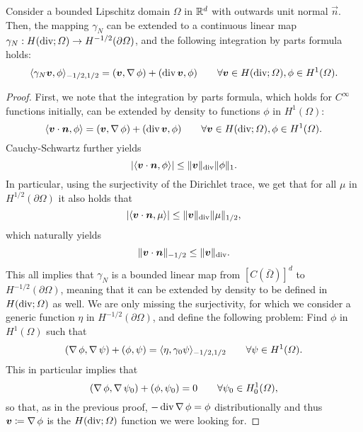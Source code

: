 \begin{theorem}\label{thm:normal-trace}
Consider a bounded Lipschitz domain $\Omega$ in $\mathbb{R}^d$ with outwards unit normal $\vec n$. Then, the mapping $\gamma_N$ can be extended to a continuous linear map $\gamma_N: H(\operatorname{\text{div}}; \Omega) \to H^{-1/2}(\partial\Omega)$, and the following integration by parts formula holds: 
\begin{equation}\label{eq:ibp-normal-trace}
    \langle \gamma_N \vec v, \phi \rangle_{-1/2, 1/2} = (\vec v, \grad \phi) + (\dive \vec v, \phi) \qquad \forall \vec v\in H(\dive;\Omega), \phi \in H^1(\Omega).
\end{equation}
\begin{proof}
First, we note that the integration by parts formula, which holds for $C^\infty$ functions initially, can be extended by density to functions $\phi$ in $H^1(\Omega)$:
\begin{equation*}
    \langle \vec v\cdot \vec n, \phi \rangle = (\vec v, \grad \phi) + (\dive \vec v, \phi) \qquad \forall \vec v\in H(\dive;\Omega), \phi \in H^1(\Omega).
\end{equation*}
Cauchy-Schwartz further yields
\begin{equation*}
    |\langle \vec v\cdot \vec n, \phi\rangle | \leq \| \vec v \|_{\dive} \| \phi \|_1.
\end{equation*}
In particular, using the surjectivity of the Dirichlet trace, we get that for all $\mu$ in $H^{1/2}(\partial\Omega)$ it also holds that
\begin{equation*}
    |\langle \vec v\cdot \vec n, \mu\rangle | \leq \| \vec v \|_{\dive} \| \mu \|_{1/2},
\end{equation*}
which naturally yields
\begin{equation*}
    \| \vec v \cdot \vec n\|_{-1/2} \leq \| \vec v\|_{\dive}.
\end{equation*}
This all implies that $\gamma_N$ is a bounded linear map from $[C(\bar\Omega)]^d$ to $H^{-1/2}(\partial\Omega)$, meaning that it can be extended by density to be defined in $H(\operatorname{\text{div}};\Omega)$ as well. We are only missing the surjectivity, for which we consider a generic function $\eta$ in $H^{-1/2}(\partial\Omega)$, and define the following problem: Find $\phi$ in $H^1(\Omega)$ such that
\begin{equation*}
    (\operatorname{\nabla} \phi, \operatorname{\nabla} \psi) + (\phi, \psi) = \langle \eta, \gamma_0 \psi \rangle_{-1/2,1/2} \qquad\forall \psi \in H^1(\Omega).
\end{equation*}
This in particular implies that 
\begin{equation*}
    (\operatorname{\nabla} \phi, \operatorname{\nabla} \psi_0) + (\phi, \psi_0) = 0 \qquad\forall \psi_0 \in H_0^1(\Omega),
\end{equation*}
so that, as in the previous proof, $-\operatorname{\text{div}} \operatorname{\nabla} \phi = \phi$ distributionally and thus $\vec v \coloneqq \grad \phi$ is the $H(\operatorname{\text{div}};\Omega)$ function we were looking for.
\end{proof}
\end{theorem}
